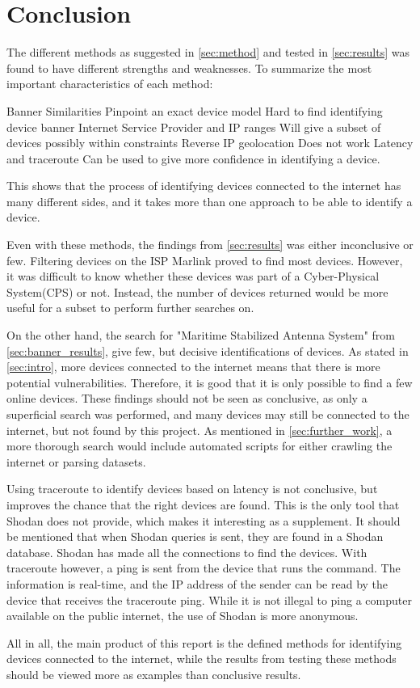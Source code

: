 \section{Conclusion} \label{sec:conclusion}

The different methods as suggested in \cref{sec:method} and tested in \cref{sec:results} was found to have different strengths and weaknesses. To summarize the most important characteristics of each method:

\begin{outline}[itemize]
    \setlength\itemsep{10em}
        \1 Banner Similarities
        \2 Pinpoint an exact device model
        \2 Hard to find identifying device banner
        \1 Internet Service Provider and IP ranges
        \2 Will give a subset of devices possibly within constraints
        \1 Reverse IP geolocation
        \2 Does not work
        \1 Latency and traceroute
        \2 Can be used to give more confidence in identifying a device.

\end{outline}

This shows that the process of identifying devices connected to the internet has many different sides, and it takes more than one approach to be able to identify a device.

Even with these methods, the findings from \cref{sec:results} was either inconclusive or few. Filtering devices on the ISP Marlink proved to find most devices. However, it was difficult to know whether these devices was part of a Cyber-Physical System(CPS) or not. Instead, the number of devices returned would be more useful for a subset to perform further searches on. 

On the other hand, the search for "Maritime Stabilized Antenna System" from \cref{sec:banner_results}, give few, but decisive identifications of devices. As stated in \cref{sec:intro}, more devices connected to the internet means that there is more potential vulnerabilities. Therefore, it is good that it is only possible to find a few online devices. These findings should not be seen as conclusive, as only a superficial search was performed, and many devices may still be connected to the internet, but not found by this project. As mentioned in \cref{sec:further_work}, a more thorough search would include automated scripts for either crawling the internet or parsing datasets. 


Using traceroute to identify devices based on latency is not conclusive, but improves the chance that the right devices are found. This is the only tool that Shodan does not provide, which makes it interesting as a supplement. It should be mentioned that when Shodan queries is sent, they are found in a Shodan database. Shodan has made all the connections to find the devices. With traceroute however, a ping is sent from the device that runs the command. The information is real-time, and the IP address of the sender can be read by the device that receives the traceroute ping. While it is not illegal to ping a computer available on the public internet, the use of Shodan is more anonymous. 


All in all, the main product of this report is the defined methods for identifying devices connected to the internet, while the results from testing these methods should be viewed more as examples than conclusive results. 
